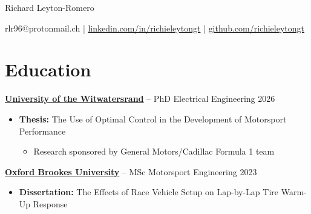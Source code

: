 \documentclass[12pt,letterpaper]{article} %
\begin{document}
\centerline{\Huge{Richard Leyton-Romero}}

\vspace{5pt} %

\centerline{{rlr96@protonmail.ch} | \href{https://www.linkedin.com/in/richieleytongt/}{linkedin.com/in/richieleytongt} | \href{https://github.com/richieleytongt}{github.com/richieleytongt}}

\vspace{-6.5pt} %



\section*{Education}

\textbf{\href{https://www.wits.ac.za/eie/}{University of the Witwatersrand}} -- PhD Electrical Engineering \hfill 2026 \\
\vspace{-9pt}
\begin{itemize}[itemsep=-4pt]
  \item \textbf{Thesis:} The Use of Optimal Control in the Development of Motorsport Performance
  \begin{itemize}\vspace{-9pt}
    \item Research sponsored by General Motors/Cadillac Formula 1 team
  \end{itemize}
\end{itemize}

\vspace{-5pt}
\textbf{\href{https://www.brookes.ac.uk/courses/postgraduate/motorsport-engineering-msc}{Oxford Brookes University}} -- MSc Motorsport Engineering \hfill 2023 \\
\vspace{-9pt}
\begin{itemize}[itemsep =-4pt]
    \item \textbf{Dissertation:} The Effects of Race Vehicle Setup on Lap-by-Lap Tire Warm-Up Response
\end{itemize}
\end{document}
